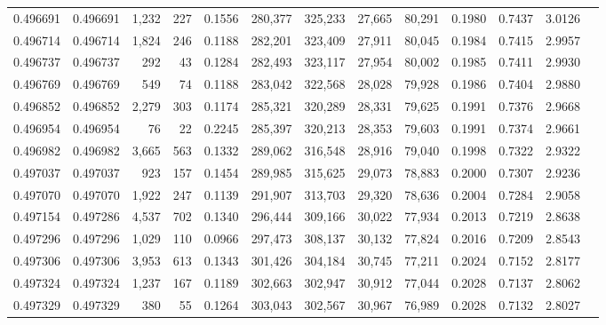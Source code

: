 \begin{tabular}{rrrrrrrrrrrrr}
0.496691 & 0.496691 & 1,232 &   227 &                                     0.1556 & 280,377 & 325,233 &  27,665 &  80,291 & 0.1980 & 0.7437 & 3.0126 \\
0.496714 & 0.496714 & 1,824 &   246 &                                     0.1188 & 282,201 & 323,409 &  27,911 &  80,045 & 0.1984 & 0.7415 & 2.9957 \\
0.496737 & 0.496737 &   292 &    43 &                                     0.1284 & 282,493 & 323,117 &  27,954 &  80,002 & 0.1985 & 0.7411 & 2.9930 \\
0.496769 & 0.496769 &   549 &    74 &                                     0.1188 & 283,042 & 322,568 &  28,028 &  79,928 & 0.1986 & 0.7404 & 2.9880 \\
0.496852 & 0.496852 & 2,279 &   303 &                                     0.1174 & 285,321 & 320,289 &  28,331 &  79,625 & 0.1991 & 0.7376 & 2.9668 \\
0.496954 & 0.496954 &    76 &    22 &                                     0.2245 & 285,397 & 320,213 &  28,353 &  79,603 & 0.1991 & 0.7374 & 2.9661 \\
0.496982 & 0.496982 & 3,665 &   563 &                                     0.1332 & 289,062 & 316,548 &  28,916 &  79,040 & 0.1998 & 0.7322 & 2.9322 \\
0.497037 & 0.497037 &   923 &   157 &                                     0.1454 & 289,985 & 315,625 &  29,073 &  78,883 & 0.2000 & 0.7307 & 2.9236 \\
0.497070 & 0.497070 & 1,922 &   247 &                                     0.1139 & 291,907 & 313,703 &  29,320 &  78,636 & 0.2004 & 0.7284 & 2.9058 \\
0.497154 & 0.497286 & 4,537 &   702 &                                     0.1340 & 296,444 & 309,166 &  30,022 &  77,934 & 0.2013 & 0.7219 & 2.8638 \\
0.497296 & 0.497296 & 1,029 &   110 &                                     0.0966 & 297,473 & 308,137 &  30,132 &  77,824 & 0.2016 & 0.7209 & 2.8543 \\
0.497306 & 0.497306 & 3,953 &   613 &                                     0.1343 & 301,426 & 304,184 &  30,745 &  77,211 & 0.2024 & 0.7152 & 2.8177 \\
0.497324 & 0.497324 & 1,237 &   167 &                                     0.1189 & 302,663 & 302,947 &  30,912 &  77,044 & 0.2028 & 0.7137 & 2.8062 \\
0.497329 & 0.497329 &   380 &    55 &                                     0.1264 & 303,043 & 302,567 &  30,967 &  76,989 & 0.2028 & 0.7132 & 2.8027 \\

\end{tabular}
